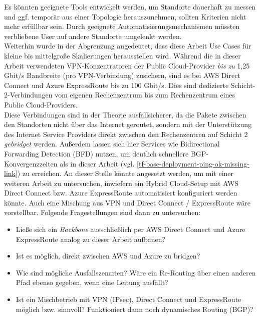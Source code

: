 Es könnten geeignete Tools entwickelt werden, um Standorte dauerhaft zu messen und ggf. temporär aus einer Topologie herauszunehmen, sollten Kriterien nicht mehr erfüllbar sein. Durch geeignete Automatisierungsmechanismen müssten verbliebene User auf andere Standorte \glqq umgelenkt\grqq{} werden.\\
Weiterhin wurde in der Abgrenzung angedeutet, dass diese Arbeit Use Cases für kleine bis mittelgroße Skalierungen herausstellen wird. Während die in dieser Arbeit verwendeten \gls{VPN-Konzentrator}en der Public Cloud-Provider \textit{bis zu} 1,25 Gbit/s Bandbreite (pro \gls{VPN}-Verbindung) zusichern, sind es bei AWS Direct Connect \cite{awsdc2020} und Azure ExpressRoute \cite{Washam2014} bis zu 100 Gbit/s. Dies sind dedizierte Schicht-2-Verbindungen vom eigenen Rechenzentrum bis zum Rechenzentrum eines Public Cloud-Providers.\\
Diese Verbindungen sind in der Theorie ausfallsicherer, da die Pakete zwischen den Standorten nicht über das Internet geroutet, sondern mit der Unterstützung des Internet Service Providers direkt zwischen den Rechenzentren auf Schicht 2 \textit{gebridget} werden. Außerdem lassen sich hier Services wie Bidirectional Forwarding Detection (BFD) nutzen, um deutlich schnellere \gls{BGP}-Konvergenzzeiten als in dieser Arbeit (vgl. \ref{tf-base-deployment-ping-ok-missing-link}) zu erreichen\cite{azurebfd2018}.
An dieser Stelle könnte angesetzt werden, um mit einer weiteren Arbeit zu untersuchen, inwiefern ein Hybrid Cloud-Setup mit AWS Direct Connect bzw. Azure ExpressRoute automatisiert konfiguriert werden könnte. Auch eine Mischung aus \gls{VPN} und Direct Connect / ExpressRoute wäre vorstellbar. Folgende Fragestellungen sind dann zu untersuchen:
\begin{itemize}
    \item Ließe sich ein \textit{Backbone} ausschließlich per AWS Direct Connect und Azure ExpressRoute analog zu dieser Arbeit aufbauen?
    \item Ist es möglich, direkt zwischen AWS und Azure zu bridgen?
    \item Wie sind mögliche Ausfallszenarien? Wäre ein Re-Routing über einen anderen Pfad ebenso gegeben, wenn eine Leitung ausfällt?
    \item Ist ein Mischbetrieb mit \gls{VPN} (\gls{IPsec}), Direct Connect und ExpressRoute möglich bzw. sinnvoll? Funktioniert dann noch dynamisches Routing (BGP)?
\end{itemize}
